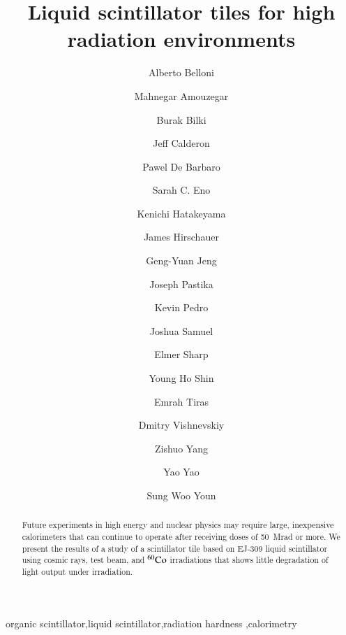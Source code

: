 \documentclass[review]{elsarticle}
\begin{document}
\begin{frontmatter}

\title{Liquid scintillator tiles for high radiation environments }


\author[umd]{Alberto Belloni}
\author[umd]{Mahnegar Amouzegar}
\author[iowa]{Burak Bilki}
\author[umd]{Jeff Calderon}
\author[rochester]{Pawel De Barbaro}
\author[umd]{Sarah C. Eno}
\author[baylor]{Kenichi Hatakeyama}
\author[fnal]{James Hirschauer}
\author[umd]{Geng-Yuan Jeng}
\author[baylor]{Joseph Pastika}
\author[fnal]{Kevin Pedro}
\author[umd]{Joshua Samuel}
\author[elmer]{Elmer Sharp}
\author[umd]{Young Ho Shin}
\author[baylor]{Emrah Tiras}
\author[rochester]{Dmitry Vishnevskiy}
\author[umd]{Zishuo Yang}
\author[umd]{Yao Yao}
\author[korea]{Sung Woo Youn}




\address[umd]{Dept. Physics, U. Maryland, College Park MD 30742 USA}
\address[korea]{Institute for Basic Science, Center for Axion and Precision Physics Research, IBS Center for Axion and Precision Physics Research
Room 4315, Department of Physics, Natural Science Building (E6-2), KAIST,
291 Daehak-ro, Yuseong-gu, Daejeon 305-701, South Korea}
\address[elmer]{Elmer Sharp Engineering, 7007 Leesville Blvd. Springfield, VA 22151}
\address[fnal]{Fermi National Accelerator Laboratory, Batavia, IL, USA}
\address[baylor]{Baylor University, Waco, Texas, USA}
\address[iowa]{The University of Iowa, Iowa City, IA, USA}
\address[rochester]{The University of Rochester, Rochester, NY, USA}

\begin{abstract}
Future experiments in high energy and nuclear physics may require
large, inexpensive calorimeters that can continue to
operate after receiving doses of 50~Mrad
or more. We present the results of a study of a scintillator tile
based on EJ-309 liquid scintillator using cosmic rays, test beam, and
${\rm ^{60}Co}$ irradiations that shows little degradation of light output
under irradiation.
\end{abstract}

\begin{keyword}
organic scintillator\sep liquid scintillator\sep radiation
hardness \sep calorimetry
\end{keyword}

\end{frontmatter}
\end{document}
